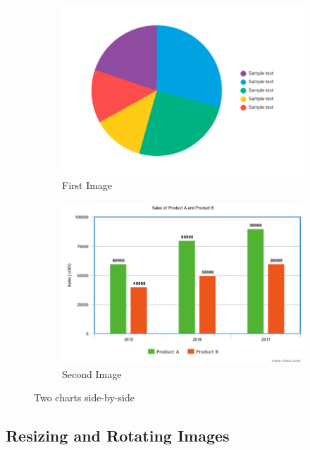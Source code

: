 \documentclass{article}
\begin{document}
\begin{figure}[h]
    \centering
    \begin{subfigure}{0.45\textwidth}
        \includegraphics[width=\linewidth]{Figures/sample-pie.png}
        \caption{First Image}
    \end{subfigure}
    \begin{subfigure}{0.45\textwidth}
        \includegraphics[width=\linewidth]{Figures/sample-bar.png}
        \caption{Second Image}
    \end{subfigure}
    \caption{Two charts side-by-side}
\end{figure}

\subsection*{Resizing and Rotating Images}
\end{document}

